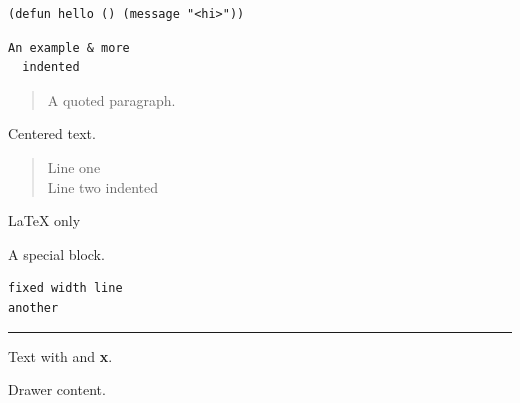 \documentclass[11pt]{article}
\date{\today}
\title{}
\begin{document}
\tableofcontents

\begin{verbatim}
(defun hello () (message "<hi>"))
\end{verbatim}

\begin{verbatim}
An example & more
  indented
\end{verbatim}

\begin{quote}
A quoted paragraph.
\end{quote}

\begin{center}
Centered text.
\end{center}

\begin{verse}
Line one\\
\hspace*{3\fontdimen2\font}Line two indented\\
\end{verse}

\LaTeX{} only

\begin{note}
A special block.
\end{note}

\begin{verbatim}
fixed width line
another
\end{verbatim}


\noindent\rule{\textwidth}{0.5pt}

Text with and \textbf{x}.

Drawer content.
\end{document}
